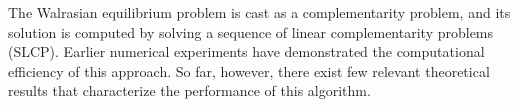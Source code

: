 The Walrasian equilibrium problem is cast as a complementarity problem, and its solution is computed by solving a sequence of linear complementarity problems (SLCP). Earlier numerical experiments have demonstrated the computational efficiency of this approach. So far, however, there exist few relevant theoretical results that characterize the performance of this algorithm.